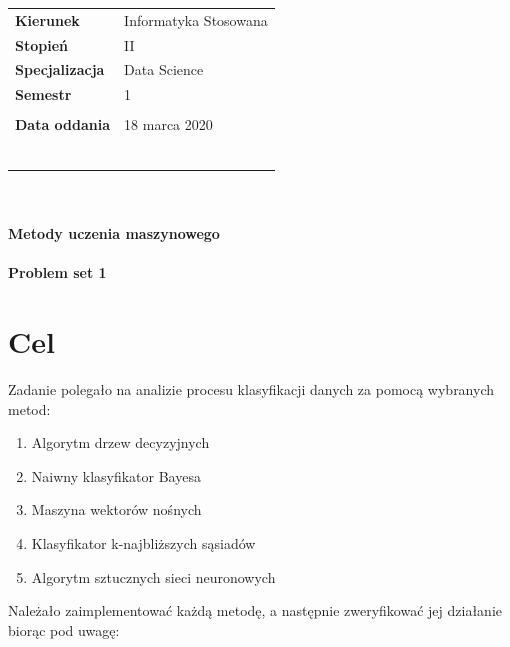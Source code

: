 \documentclass[a4paper,11pt]{article}
\begin{document}
\begin{titlepage}
\vspace{25px}

\begin{tabular}{ll}
\LARGE{\textbf{Kierunek}}& \LARGE{Informatyka Stosowana} \\
\LARGE{\textbf{Stopień}}& \LARGE{II} \\
\LARGE{\textbf{Specjalizacja}}& \LARGE{Data Science} \\
\LARGE{\textbf{Semestr}}& \LARGE{1} \\\\
\LARGE{\textbf{Data oddania}}& \LARGE{18 marca 2020} \\\\\\\\\\\\\\
\end{tabular}

\begin{center}
\textbf{\huge{\\~\\Metody uczenia maszynowego }}
\textbf{\Huge{\\~\\Problem set 1}}
\end{center}

\end{titlepage}

\setcounter{page}{2}
\tableofcontents
\newpage
{}

\section{Cel}
Zadanie polegało na analizie procesu klasyfikacji danych za pomocą wybranych metod:

\begin{enumerate}
    \item Algorytm drzew decyzyjnych
    \item Naiwny klasyfikator Bayesa
    \item Maszyna wektorów nośnych
    \item Klasyfikator k-najbliższych sąsiadów
    \item Algorytm sztucznych sieci neuronowych
\end{enumerate}

Należało zaimplementować każdą metodę, a następnie zweryfikować jej działanie biorąc pod uwagę:
\end{document}
